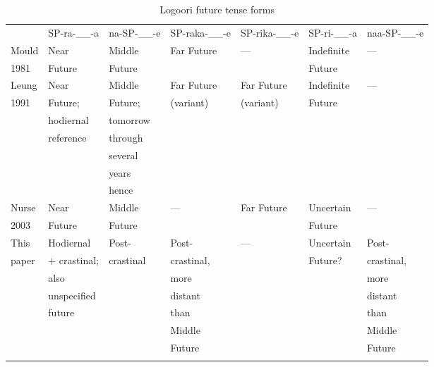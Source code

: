 \documentclass[output=paper]{langsci/langscibook}
\begin{document}
\begin{table}
\begin{tabular}{lllllll} & \scriptsize SP-{ra-}\_\_{{}-a} & \scriptsize {na-}SP-\_\_{{}-e} & \scriptsize SP-{raka-}\_\_-{e} & \scriptsize SP-{rika}{}-\_\_-{e} & \scriptsize SP-{ri}{}-\_\_{{}-a} & \scriptsize {naa-}SP-\_\_{{}-e} \\
\lsptoprule
\footnotesize Mould & \footnotesize Near & \footnotesize Middle & \footnotesize Far Future & \footnotesize — & \footnotesize Indefinite & \footnotesize — \\ 
\footnotesize 1981 & \footnotesize Future & \footnotesize Future & & & \footnotesize Future & \\ \midrule
\footnotesize Leung & \footnotesize Near & \footnotesize Middle & \footnotesize Far Future & \footnotesize Far Future & \footnotesize Indefinite & \mdseries \footnotesize — \\ 
\footnotesize 1991 & \footnotesize Future; & \footnotesize Future; & \footnotesize (variant) & \footnotesize (variant) & \footnotesize Future & \\
& \footnotesize hodiernal & \footnotesize tomorrow & & & &  \\
& \footnotesize reference & \footnotesize through & & & & \\
& & \footnotesize several & & & & \\
& & \footnotesize years & & & & \\
& & \footnotesize hence & & & & \\
\midrule 
\footnotesize Nurse & \footnotesize Near & \footnotesize Middle & \footnotesize — & \footnotesize Far Future & \footnotesize Uncertain & \mdseries \footnotesize — \\ 
\footnotesize 2003 & \footnotesize Future & \footnotesize Future & & & \footnotesize Future & \\ \midrule
\footnotesize This & \footnotesize Hodiernal & \footnotesize Post- & \footnotesize Post- & \footnotesize — & \footnotesize Uncertain & \footnotesize Post- \\
\footnotesize paper & \footnotesize + crastinal; & \footnotesize crastinal & \footnotesize crastinal, & & \footnotesize Future? & \footnotesize crastinal, \\
& \footnotesize also & & \footnotesize more & & & \footnotesize more \\
& \footnotesize unspecified & & \footnotesize distant & & & \footnotesize distant \\
& \footnotesize future & & \footnotesize than & & & \footnotesize than \\
& & & \footnotesize Middle & & & \footnotesize Middle \\
& & & \footnotesize Future & & & \footnotesize Future \\
\lspbottomrule
\end{tabular}
\caption{Logoori future tense forms}
\label{tab:sarvasy:1}
\end{table}
\end{document}
